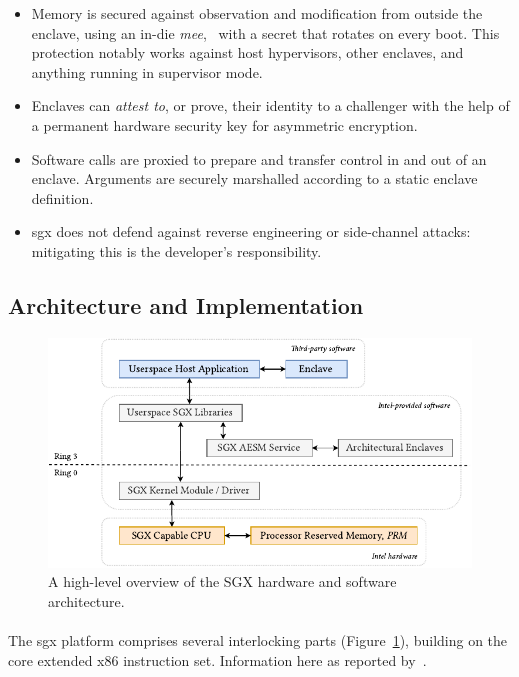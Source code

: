 \begin{itemize}
    \item Memory is secured against observation and modification from outside the enclave, using an in-die \textit{\acrfull{mee}},~\cite{sgx-mee} with a secret that rotates on every boot. This protection notably works against host hypervisors, other enclaves, and anything running in supervisor mode.
    \item Enclaves can \textit{attest to}, or prove, their identity to a challenger with the help of a permanent hardware security key for asymmetric encryption.
    \item Software calls are proxied to prepare and transfer control in and out of an enclave. Arguments are securely marshalled according to a static enclave definition.
    \item \acrshort{sgx} does not defend against reverse engineering or side-channel attacks:~\cite{10.1109/SP.2015.45} mitigating this is the developer's responsibility.
\end{itemize}

\subsection{Architecture and Implementation}

\begin{figure}[]
    \centering
    \includegraphics[width=0.9\linewidth]{figures/SGX-AdvArchitecture.pdf}
    \caption{A high-level overview of the SGX hardware and software architecture.}
    \label{fig:sgx-advarch}
\end{figure}

\paragraph{} The \acrshort{sgx} platform comprises several interlocking parts (Figure~\ref{fig:sgx-advarch}), building on the core extended x86 instruction set. Information here as reported by~\cite{sgx-sgx-reference,Costan2016IntelSE}.

